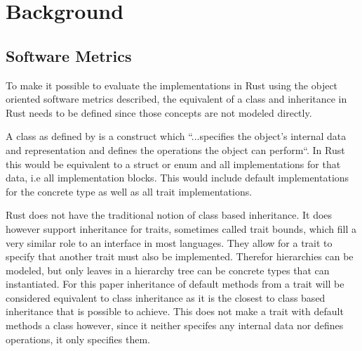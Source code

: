 \documentclass[conference]{IEEEtran}
\begin{document}


\section{Background}

\subsection{Software Metrics}
\label{sub:software_metrics}
To make it possible to evaluate the implementations in Rust using the object oriented software metrics described, the equivalent of a class and inheritance in Rust needs to be defined since those concepts are not modeled directly.

A class as defined by \citet{gamma1993:gof} is a construct which  ``...specifies the object's internal data and representation and defines the operations the object can perform``.
In Rust this would be equivalent to a struct or enum and all implementations for that data, i.e all implementation blocks.
This would include default implementations for the concrete type as well as all trait implementations.

Rust does not have the traditional notion of class based inheritance.
It does however support inheritance for traits, sometimes called trait bounds, which fill a very similar role to an interface in most languages.
They allow for a trait to specify that another trait must also be implemented.
Therefor hierarchies can be modeled, but only leaves in a hierarchy tree can be concrete types that can instantiated.
For this paper inheritance of default methods from a trait will be considered equivalent to class inheritance as it is the closest to class based inheritance that is possible to achieve.
This does not make a trait with default methods a class however, since it neither specifes any internal data nor defines operations, it only specifies them.
\end{document}
